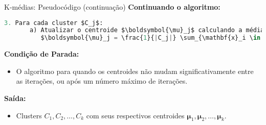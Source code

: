 \documentclass{beamer}
\begin{document}
\begin{frame}[fragile]{K-médias: Pseudocódigo (continuação)}
    \textbf{Continuando o algoritmo:}
    \begin{lstlisting}[language=Python, mathescape=true]
3. Para cada cluster $C_j$:
       a) Atualizar o centroide $\boldsymbol{\mu}_j$ calculando a média dos pontos atribuídos ao cluster:
          $\boldsymbol{\mu}_j = \frac{1}{|C_j|} \sum_{\mathbf{x}_i \in C_j} \mathbf{x}_i$
    \end{lstlisting}
    \vspace{0.3cm}
    \textbf{Condição de Parada:}
    \begin{itemize}
        \item O algoritmo para quando os centroides não mudam significativamente entre as iterações, ou após um número máximo de iterações.
    \end{itemize}
    \vspace{0.3cm}
    \textbf{Saída:}
    \begin{itemize}
        \item Clusters \( C_1, C_2, \dots, C_k \) com seus respectivos centroides \( \boldsymbol{\mu}_1, \boldsymbol{\mu}_2, \dots, \boldsymbol{\mu}_k \).
    \end{itemize}
\end{frame}

\end{document}
